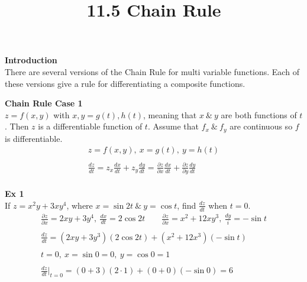 \documentclass{article}
\title{11.5 Chain Rule}
\begin{document}
  \maketitle
  \textbf{Introduction}\\
  There are several versions of the Chain Rule for multi variable functions. Each of these versions give a rule for differentiating a composite functions.

  \textbf{Chain Rule Case 1}\\
  $ z=f(x,y) $ with $ x,y =g(t),h(t) $, meaning that $ x ~\&~ y $ are both functions of $ t $. Then $ z $ is a differentiable function of $ t $. Assume that $ f_{x} ~\&~ f_{y}   $ are continuous so $ f $ is differentiable.  
  \[
    \begin{gathered}
    z=f(x,y),~x=g(t),~y=h(t)\\
    ~\\
    \frac{dz}{dt} = z_{x} \frac{dx}{dt} + z_{y}\frac{dy}{dt} =  \frac{\partial z}{\partial x} \frac{dx}{dt}+\frac{\partial z}{\partial y} \frac{dy}{dt} 
    ~\\
    \end{gathered}
  \]

  \textbf{Ex 1}\\
  If $ z=x^{2}y+3xy^{4} $, where $ x=\sin{2t} ~\&~ y=\cos{t}$, find $ \frac{dz}{dt} $ when $ t=0 $.
  \[
    \begin{gathered}
    \frac{\partial z}{\partial x} = 2xy+3y^{4},~\frac{dx}{dt} =2\cos{2t} \qquad \frac{\partial z}{\partial x}=x^{2}+12xy^{3},~\frac{dy}{i}=-\sin{t}\\
    ~\\
    \frac{dz}{dt} = (2xy+3y^{3} )(2\cos{2t})+(x^{2}+12x^{3} )(-\sin{t})\\
    ~\\
    t=0,~x=\sin{0}=0,~y=\cos{0}=1\\
    ~\\
  \frac{dz}{dt} |_{t=0} =(0+3)(2\cdot 1)+(0+0)(-\sin{0})=\boxed{6}
    \end{gathered}
  \]
\end{document}
